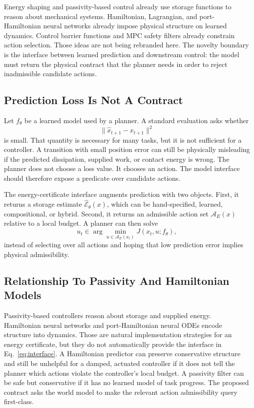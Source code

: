\documentclass{article}
\newcommand{\state}{x}
\newcommand{\action}{u}
\newcommand{\storage}{\mathcal{E}}
\newcommand{\admiss}{\mathcal{A}}
\begin{document}
Energy shaping and passivity-based control already use storage functions to reason about mechanical systems. Hamiltonian, Lagrangian, and port-Hamiltonian neural networks already impose physical structure on learned dynamics. Control barrier functions and MPC safety filters already constrain action selection. Those ideas are not being rebranded here. The novelty boundary is the interface between learned prediction and downstream control: the model must return the physical contract that the planner needs in order to reject inadmissible candidate actions.

\subsection{Prediction Loss Is Not A Contract}

Let $f_\theta$ be a learned model used by a planner. A standard evaluation asks whether
\begin{equation}
    \|\hat{\state}_{t+1}-\state_{t+1}\|^2
\end{equation}
is small. That quantity is necessary for many tasks, but it is not sufficient for a controller. A transition with small position error can still be physically misleading if the predicted dissipation, supplied work, or contact energy is wrong. The planner does not choose a loss value. It chooses an action. The model interface should therefore expose a predicate over candidate actions.

The energy-certificate interface augments prediction with two objects. First, it returns a storage estimate $\hat{\storage}_\theta(\state)$, which can be hand-specified, learned, compositional, or hybrid. Second, it returns an admissible action set $\admiss_E(\state)$ relative to a local budget. A planner can then solve
\begin{equation}
    \action_t \in \arg\min_{\action\in \admiss_E(\state_t)}
    J(\state_t,\action;f_\theta),
    \label{eq:planner}
\end{equation}
instead of selecting over all actions and hoping that low prediction error implies physical admissibility.

\subsection{Relationship To Passivity And Hamiltonian Models}

Passivity-based controllers reason about storage and supplied energy. Hamiltonian neural networks and port-Hamiltonian neural ODEs encode structure into dynamics. Those are natural implementation strategies for an energy certificate, but they do not automatically provide the interface in Eq.~\ref{eq:interface}. A Hamiltonian predictor can preserve conservative structure and still be unhelpful for a damped, actuated controller if it does not tell the planner which actions violate the controller's local budget. A passivity filter can be safe but conservative if it has no learned model of task progress. The proposed contract asks the world model to make the relevant action admissibility query first-class.
\end{document}
